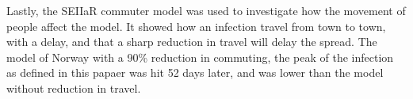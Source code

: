 \documentclass{article}
\begin{document}
    Lastly, the SEIIaR commuter model was used to investigate how the movement of people affect the model.
    It showed how an infection travel from town to town, with a delay, and that a sharp reduction in travel will delay the spread. 
    The model of Norway with a 90\% reduction in commuting, the peak of the infection as defined in this papaer was hit 52 days later, and was lower than the model without reduction in travel.
    \printbibliography
\end{document}
